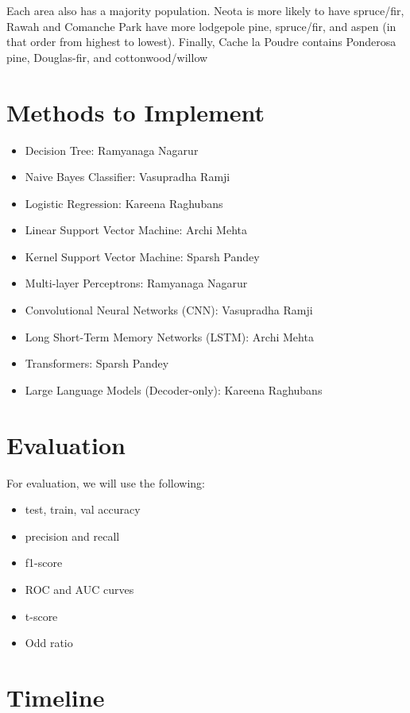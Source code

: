 \documentclass[11pt]{article}
\begin{document}
Each area also has a majority population. Neota is more likely to have spruce/fir, Rawah and Comanche Park have more lodgepole pine, spruce/fir, and aspen (in that order from highest to lowest). Finally, Cache la Poudre contains Ponderosa pine, Douglas-fir, and cottonwood/willow

\pagebreak

{\small

}

\section{Methods to Implement}

\begin{itemize}
	\item Decision Tree: Ramyanaga Nagarur 
	\item Naive Bayes Classifier: Vasupradha Ramji
	\item Logistic Regression: Kareena Raghubans
	\item Linear Support Vector Machine: Archi Mehta
	\item Kernel Support Vector Machine: Sparsh Pandey
	\item Multi-layer Perceptrons: Ramyanaga Nagarur 
	\item Convolutional Neural Networks (CNN): Vasupradha Ramji
	\item Long Short-Term Memory Networks (LSTM): Archi Mehta
	\item Transformers: Sparsh Pandey
	\item Large Language Models (Decoder-only): Kareena Raghubans

\end{itemize}
\section{Evaluation}

For evaluation, we will use the following:

\begin{itemize}
	\item test, train, val accuracy
	\item precision and recall
	\item f1-score
	\item ROC and AUC curves
	\item t-score
	\item Odd ratio
\end{itemize}

\section{Timeline}
\end{document}
